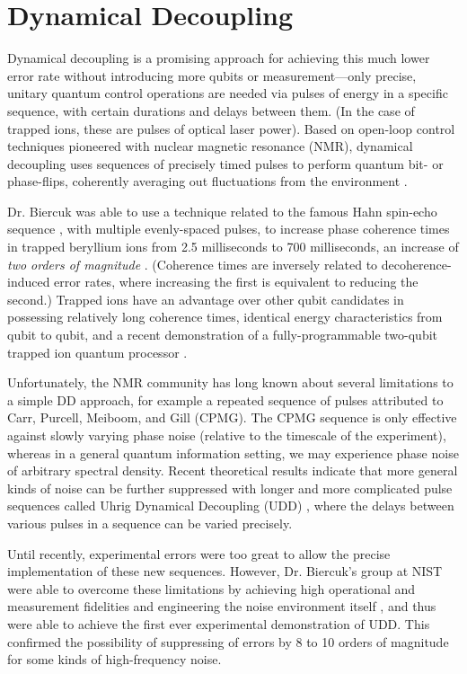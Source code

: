 \documentclass{article}
\begin{document}
\section{Dynamical Decoupling}

Dynamical decoupling is a promising approach for achieving this much lower error
rate without introducing more qubits or measurement---only precise, unitary quantum
control operations are needed via pulses of energy in a specific sequence, with
certain durations and delays between them. (In the case of trapped ions, these
are pulses of optical laser power).
Based on open-loop control techniques pioneered with
nuclear magnetic resonance (NMR), dynamical decoupling uses sequences of
precisely timed pulses to perform quantum bit- or phase-flips, coherently
averaging out fluctuations from the environment \cite{VL1998}.

Dr. Biercuk was able to use a technique related to the famous Hahn spin-echo
sequence \cite{Vandersypen2004}, with multiple evenly-spaced pulses,
to increase phase coherence times in trapped beryllium ions from 2.5 milliseconds
to 700 milliseconds, an
increase of {\em two orders of magnitude} \cite{BUVSIB2009a}.
(Coherence times are inversely related to decoherence-induced error rates,
where increasing the first is equivalent to reducing the second.)
Trapped ions have an advantage over
other qubit candidates in possessing relatively long coherence times,
identical energy characteristics from qubit to qubit, and a recent
demonstration of a fully-programmable two-qubit trapped ion quantum processor
 \cite{Hanneke2009}.

Unfortunately, the NMR community has long known about several limitations
to a simple DD approach, for example a repeated sequence of
pulses attributed to Carr, Purcell, Meiboom, and Gill (CPMG). The CPMG
sequence is only effective against slowly varying phase noise (relative to
the timescale of the experiment), whereas
in a general quantum information setting, we may experience phase noise
of arbitrary spectral density.
Recent theoretical results indicate that more general kinds of noise can be further
suppressed with longer and more complicated pulse sequences called
Uhrig Dynamical Decoupling (UDD) \cite{Uhrig2007}, where the delays between various
pulses in a sequence can be varied precisely.

Until recently, experimental errors were too great to allow the precise
implementation of these new sequences. However, Dr. Biercuk's group at NIST
were able to overcome these limitations by achieving high operational
and measurement fidelities and engineering the noise
environment itself \cite{BUVSIB2009b}, and thus were able to achieve
the first ever experimental demonstration of UDD. This confirmed the
possibility of
suppressing of errors by 8 to 10 orders of magnitude for some kinds of
high-frequency noise.
\end{document}
